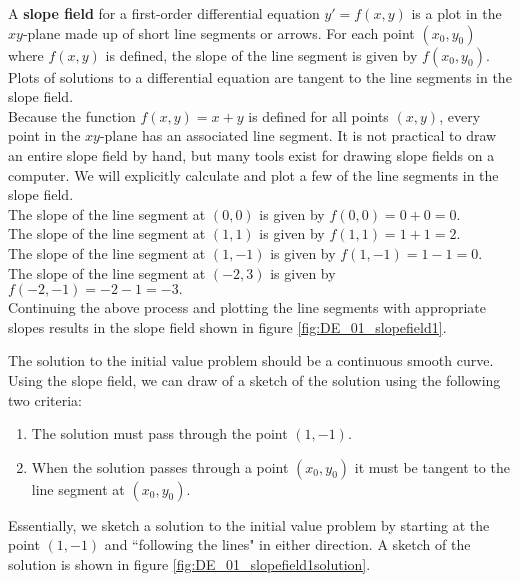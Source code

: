 {A \textbf{slope field} for a first-order differential equation $y' = f(x,y)$ is a plot in the $xy$-plane made up of short line segments or arrows. For each point $(x_0,y_0)$ where $f(x,y)$ is defined, the slope of the line segment is given by $f(x_0,y_0)$. Plots of solutions to a differential equation are tangent to the line segments in the slope field.}\\

{Because the function $f(x,y) = x+y$ is defined for all points $(x,y)$, every point in the $xy$-plane has an associated line segment. It is not practical to draw an entire slope field by hand, but many tools exist for drawing slope fields on a computer.  We will explicitly calculate and plot a few of the line segments in the slope field.\\

\noindent The slope of the line segment at $(0,0)$ is given by $f(0,0) = 0 + 0 = 0.$\\

\noindent The slope of the line segment at $(1,1)$ is given by $f(1,1) = 1 + 1 = 2.$\\

\noindent The slope of the line segment at $(1,-1)$ is given by $f(1,-1) = 1 - 1 = 0.$\\

\noindent The slope of the line segment at $(-2,3)$ is given by $f(-2,-1) = -2 - 1 = -3.$\\

Continuing the above process and plotting the line segments with appropriate slopes results in the slope field shown in figure \ref{fig:DE_01_slopefield1}.
}\\


{The solution to the initial value problem should be a continuous smooth curve.  Using the slope field, we can draw of a sketch of the solution using the following two criteria:

\begin{enumerate}
\item The solution must pass through the point $(1,-1)$.
\item When the solution passes through a point $(x_0,y_0)$ it must be tangent to the line segment at $(x_0,y_0)$.
\end{enumerate}
Essentially, we sketch a solution to the initial value problem by starting at the point $(1,-1)$ and ``following the lines" in either direction.  A sketch of the solution is shown in figure \ref{fig:DE_01_slopefield1solution}.
}\\

